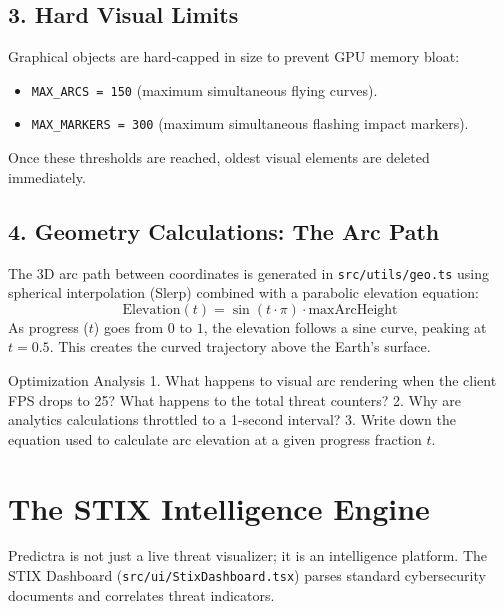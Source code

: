 \documentclass[11pt,a4paper]{report}
\begin{document}
\section{3. Hard Visual Limits}
Graphical objects are hard-capped in size to prevent GPU memory bloat:
\begin{itemize}
  \item \texttt{MAX\_ARCS = 150} (maximum simultaneous flying curves).
  \item \texttt{MAX\_MARKERS = 300} (maximum simultaneous flashing impact markers).
\end{itemize}
Once these thresholds are reached, oldest visual elements are deleted immediately.

\section{4. Geometry Calculations: The Arc Path}
The 3D arc path between coordinates is generated in \texttt{src/utils/geo.ts} using spherical interpolation (Slerp) combined with a parabolic elevation equation:
\begin{equation}
  \text{Elevation}(t) = \sin(t \cdot \pi) \cdot \text{maxArcHeight}
\end{equation}
As progress ($t$) goes from $0$ to $1$, the elevation follows a sine curve, peaking at $t=0.5$. This creates the curved trajectory above the Earth's surface.

\begin{activerecall}{Optimization Analysis}
  1. What happens to visual arc rendering when the client FPS drops to 25? What happens to the total threat counters?
  2. Why are analytics calculations throttled to a 1-second interval?
  3. Write down the equation used to calculate arc elevation at a given progress fraction $t$.
\end{activerecall}

\newpage

\chapter{The STIX Intelligence Engine}

Predictra is not just a live threat visualizer; it is an intelligence platform. The STIX Dashboard (\texttt{src/ui/StixDashboard.tsx}) parses standard cybersecurity documents and correlates threat indicators.
\end{document}

